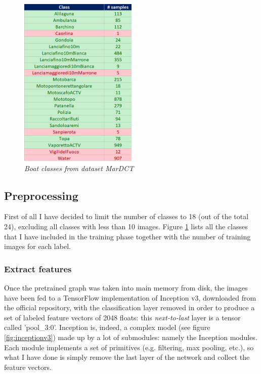 \documentclass[12pt]{article}
\begin{document}
\begin{figure}[!ht]
	\centering %
	\includegraphics[width=0.5\textwidth]{labels.png} %
	\caption{\textit{Boat classes from dataset MarDCT}} %
	\label{fig:labels}
\end{figure}

\subsection{Preprocessing}
\label{sec:preprocessing}

First of all I have decided to limit the number of classes to 18 (out of the total 24), excluding all classes with less than 10 images. Figure \ref{fig:labels} lists all the classes that I have included in the training phase together with the number of training images for each label.

\subsubsection{Extract features}
Once the pretrained graph was taken into main memory from disk, the images have been fed to a TensorFlow implementation of Inception v3, downloaded from the official repository, with the classification layer removed in order to produce a set of labeled feature vectors of 2048 floats: this \textit{next-to-last} layer is a tensor called 'pool\_3:0'. Inception is, indeed, a complex model (see figure \ref{fig:inceptionv3}) made up by a lot of submodules: namely the Inception modules. Each module implements a set of primitives (e.g. filtering, max pooling, etc.), so what I have done is simply remove the last layer of the network and collect the feature vectors.
\end{document}
